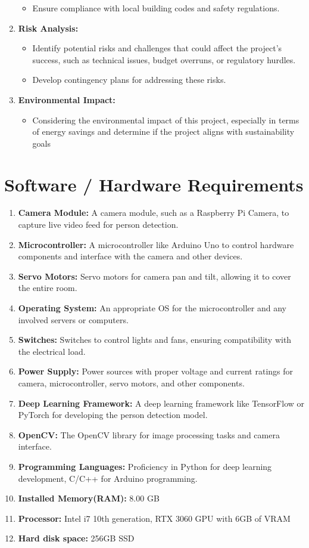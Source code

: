 \documentclass[12pt,a4paper]{report}
\begin{document}
\begin{enumerate}
\begin{itemize}
     \item Ensure compliance with local building codes and safety regulations.
     \end{itemize}
    \item \textbf{Risk Analysis:}
     \begin{itemize}
     \item Identify potential risks and challenges that could affect the project's success, such as technical issues, budget overruns, or regulatory hurdles.
     \item Develop contingency plans for addressing these risks.
     \end{itemize}
    \item \textbf{Environmental Impact:}
     \begin{itemize}
     \item Considering the environmental impact of this project, especially in terms of energy savings and determine if the project aligns with sustainability goals
     \end{itemize}
\end{enumerate}

\section*{Software / Hardware Requirements}
\begin{enumerate}
    \item \textbf{Camera Module:} A camera module, such as a Raspberry Pi Camera, to capture live video feed for person detection.
    \item \textbf{Microcontroller:} A microcontroller like Arduino Uno to control hardware components and interface with the camera and other devices.
    \item \textbf{Servo Motors:} Servo motors for camera pan and tilt, allowing it to cover the entire room.
    \item \textbf{Operating System:} An appropriate OS for the microcontroller and any involved servers or computers.
    \item \textbf{Switches:} Switches to control lights and fans, ensuring compatibility with the electrical load.
    \item \textbf{Power Supply:} Power sources with proper voltage and current ratings for camera, microcontroller, servo motors, and other components.
    \item \textbf{Deep Learning Framework:} A deep learning framework like TensorFlow or PyTorch for developing the person detection model.
    \item \textbf{OpenCV:} The OpenCV library for image processing tasks and camera interface.
    \item \textbf{Programming Languages:} Proficiency in Python for deep learning development, C/C++ for Arduino programming.
    \item \textbf{Installed Memory(RAM):} 8.00 GB
    \item \textbf{Processor:} Intel i7 10th generation, RTX 3060 GPU with 6GB of VRAM
    \item \textbf{Hard disk space: }256GB SSD
\end{enumerate}
\end{document}
